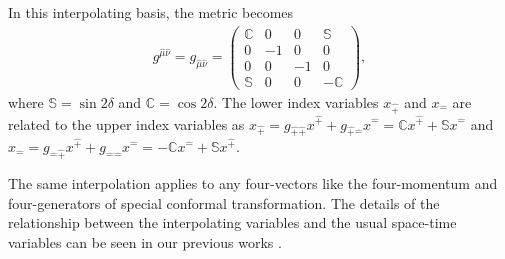 \documentclass[%
 reprint,
superscriptaddress,
 amsmath,amssymb,
 aps,
]{revtex4-2}
\begin{document}
 In this interpolating basis, the metric becomes
\begin{align}\label{eqn:g_munu_interpolation}
  g^{\hat{\mu}\hat{\nu}}
  = g_{\hat{\mu}\hat{\nu}}
  =
  \begin{pmatrix}
    \mathbb{C} & 0  & 0  & \mathbb{S} \\
    0 & -1 & 0  & 0 \\
    0 & 0  & -1 & 0 \\
    \mathbb{S} & 0  & 0  & -\mathbb{C}
  \end{pmatrix},
\end{align}
where $\mathbb{S}=\sin2\delta$ and $\mathbb{C}=\cos2\delta$. The lower index variables $x_{\hat{+}}$ and $x_{\hat{-}}$ are related to the upper index variables as $x_{\hat{+}}=g_{\hat{+}\hat{+}}x^{\hat{+}}+g_{\hat{+}\hat{-}}x^{\hat{-}}=\mathbb{C}x^{\hat{+}}+\mathbb{S}x^{\hat{-}}$ and $x_{\hat{-}}=g_{\hat{-}\hat{+}}x^{\hat{+}}+g_{\hat{-}\hat{-}}x^{\hat{-}}=-\mathbb{C}x^{\hat{-}}+\mathbb{S}x^{\hat{+}}$.

The same interpolation
applies to any four-vectors like the four-momentum and four-generators of special conformal transformation. The details of the relationship between the
interpolating variables and the usual space-time variables
can be seen in our previous works  \cite{Ji2001, Hornbostel1992, Ji1996, Ji2012, Ji2015EM, Ji2015SP, Ji2018QED, Ji2021QCD}.
\end{document}
